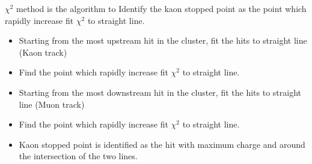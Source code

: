


$\chi^{2}$ method is the algorithm to 
Identify the kaon stopped point as  the point which rapidly increase fit $\chi^{2}$ to straight line.
\begin{itemize}
\item Starting from the most upstream hit in the cluster, fit the hits to straight line (Kaon track)
\item Find the point which rapidly increase fit $\chi^{2}$ to straight line.
\item Starting from the most downstream hit in the cluster, fit the hits to straight line (Muon track)
\item Find the point which rapidly increase fit $\chi^{2}$ to straight line.
\item Kaon stopped point is identified as the hit with maximum charge and around the intersection of the two lines.
\end{itemize}

